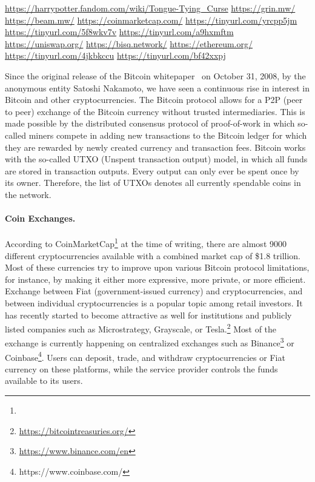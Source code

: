 \urldef\urlharrypotter\url{https://harrypotter.fandom.com/wiki/Tongue-Tying_Curse}
\urldef\urlgrin\url{https://grin.mw/}
\urldef\urlbeam\url{https://beam.mw/}
\urldef{\urlcoinmkt}\url{https://coinmarketcap.com/}
\urldef{\urlmtgox}\url{https://tinyurl.com/yrcpp5jm}
\urldef{\urlbitgrail}\url{https://tinyurl.com/5f8wkv7v}
\urldef{\urlquadriga}\url{https://tinyurl.com/a9hxmftm}
\urldef{\urluniswp}\url{https://uniswap.org/}
\urldef{\urlbisq}\url{https://bisq.network/}
\urldef{\urlethereum}\url{https://ethereum.org/}
\urldef{\urlgrinfund}\url{https://tinyurl.com/4jkbkccu}
\urldef{\urldelist}\url{https://tinyurl.com/bf42xxpj}

Since the original release of the Bitcoin whitepaper~\cite{nakamoto2019bitcoin} on October 31, 2008, by the anonymous entity Satoshi Nakamoto, we have seen a continuous rise in interest in Bitcoin and other cryptocurrencies.
The Bitcoin protocol allows for a P2P (peer to peer) exchange of the Bitcoin currency without trusted intermediaries.
This is made possible by the distributed consensus protocol of proof-of-work in which so-called miners compete in adding new transactions to the Bitcoin ledger for which they are rewarded by newly created currency and transaction fees.
Bitcoin works with the so-called UTXO (Unspent transaction output) model, in which all funds are stored in transaction outputs. Every output can only ever be spent once by its owner. Therefore, the list of UTXOs denotes all currently spendable coins in the network.

\paragraph{Coin Exchanges.} According to CoinMarketCap\footnote{\urlcoinmkt} at the time of writing, there are almost 9000 different cryptocurrencies available with a combined market cap of \$1.8 trillion.
Most of these currencies try to improve upon various Bitcoin protocol limitations, for instance, by making it either more expressive, more private, or more efficient.
Exchange between Fiat (government-issued currency) and cryptocurrencies, and between individual cryptocurrencies is a popular topic among retail investors.
It has recently started to become attractive as well for institutions and publicly listed companies such as Microstrategy, Grayscale, or Tesla.\footnote{\url{https://bitcointreasuries.org/}}
Most of the exchange is currently happening on centralized exchanges such as Binance\footnote{\url{https://www.binance.com/en}} or Coinbase\footnote{https://www.coinbase.com/}.
Users can deposit, trade, and withdraw cryptocurrencies or Fiat currency on these platforms, while the service provider controls the funds available to its users.

